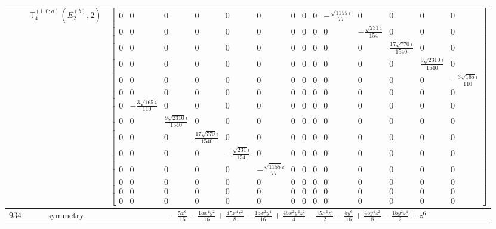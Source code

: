 \documentclass[fleqn,8pt,landscape]{jsarticle}
\begin{document}
\begin{longtable}{ccc}
$  $ & $ \mathbb{T}_{4}^{(1,0;a)}(E_{2}^{(b)},2) $ & $ \begin{bmatrix} 0 & 0 & 0 & 0 & 0 & 0 & 0 & 0 & 0 & - \frac{\sqrt{1155} i}{77} & 0 & 0 & 0 & 0 \\ 0 & 0 & 0 & 0 & 0 & 0 & 0 & 0 & 0 & 0 & - \frac{\sqrt{231} i}{154} & 0 & 0 & 0 \\ 0 & 0 & 0 & 0 & 0 & 0 & 0 & 0 & 0 & 0 & 0 & \frac{17 \sqrt{770} i}{1540} & 0 & 0 \\ 0 & 0 & 0 & 0 & 0 & 0 & 0 & 0 & 0 & 0 & 0 & 0 & \frac{9 \sqrt{2310} i}{1540} & 0 \\ 0 & 0 & 0 & 0 & 0 & 0 & 0 & 0 & 0 & 0 & 0 & 0 & 0 & - \frac{3 \sqrt{165} i}{110} \\ 0 & 0 & 0 & 0 & 0 & 0 & 0 & 0 & 0 & 0 & 0 & 0 & 0 & 0 \\ 0 & - \frac{3 \sqrt{165} i}{110} & 0 & 0 & 0 & 0 & 0 & 0 & 0 & 0 & 0 & 0 & 0 & 0 \\ 0 & 0 & \frac{9 \sqrt{2310} i}{1540} & 0 & 0 & 0 & 0 & 0 & 0 & 0 & 0 & 0 & 0 & 0 \\ 0 & 0 & 0 & \frac{17 \sqrt{770} i}{1540} & 0 & 0 & 0 & 0 & 0 & 0 & 0 & 0 & 0 & 0 \\ 0 & 0 & 0 & 0 & - \frac{\sqrt{231} i}{154} & 0 & 0 & 0 & 0 & 0 & 0 & 0 & 0 & 0 \\ 0 & 0 & 0 & 0 & 0 & - \frac{\sqrt{1155} i}{77} & 0 & 0 & 0 & 0 & 0 & 0 & 0 & 0 \\ 0 & 0 & 0 & 0 & 0 & 0 & 0 & 0 & 0 & 0 & 0 & 0 & 0 & 0 \\ 0 & 0 & 0 & 0 & 0 & 0 & 0 & 0 & 0 & 0 & 0 & 0 & 0 & 0 \\ 0 & 0 & 0 & 0 & 0 & 0 & 0 & 0 & 0 & 0 & 0 & 0 & 0 & 0 \end{bmatrix} $ \\ \hline
$ 934 $ & $ \text{symmetry} $ & $ - \frac{5 x^{6}}{16} - \frac{15 x^{4} y^{2}}{16} + \frac{45 x^{4} z^{2}}{8} - \frac{15 x^{2} y^{4}}{16} + \frac{45 x^{2} y^{2} z^{2}}{4} - \frac{15 x^{2} z^{4}}{2} - \frac{5 y^{6}}{16} + \frac{45 y^{4} z^{2}}{8} - \frac{15 y^{2} z^{4}}{2} + z^{6} $ \\

\end{longtable}
\end{document}
